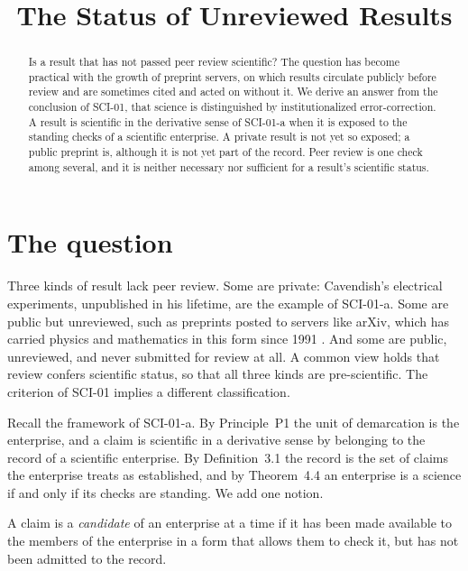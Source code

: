 \documentclass{situationist-preprint}
\title{The Status of Unreviewed Results}
\begin{document}
\maketitle

\begin{abstract}
Is a result that has not passed peer review scientific? The question has become practical with the growth of preprint servers, on which results circulate publicly before review and are sometimes cited and acted on without it. We derive an answer from the conclusion of SCI-01, that science is distinguished by institutionalized error-correction. A result is scientific in the derivative sense of SCI-01-a when it is exposed to the standing checks of a scientific enterprise. A private result is not yet so exposed; a public preprint is, although it is not yet part of the record. Peer review is one check among several, and it is neither necessary nor sufficient for a result's scientific status.
\end{abstract}

\section{The question}\label{s:question}

Three kinds of result lack peer review. Some are private: Cavendish's electrical experiments, unpublished in his lifetime, are the example of SCI-01-a. Some are public but unreviewed, such as preprints posted to servers like arXiv, which has carried physics and mathematics in this form since 1991 \citep{Ginsparg2011}. And some are public, unreviewed, and never submitted for review at all. A common view holds that review confers scientific status, so that all three kinds are pre-scientific. The criterion of SCI-01 implies a different classification.

Recall the framework of SCI-01-a. By Principle~P1 the unit of demarcation is the enterprise, and a claim is scientific in a derivative sense by belonging to the record of a scientific enterprise. By Definition~3.1 the record is the set of claims the enterprise treats as established, and by Theorem~4.4 an enterprise is a science if and only if its checks are standing. We add one notion.

\begin{definition}[Candidate]\label{d:candidate}
A claim is a \emph{candidate} of an enterprise at a time if it has been made available to the members of the enterprise in a form that allows them to check it, but has not been admitted to the record.
\end{definition}
\end{document}
